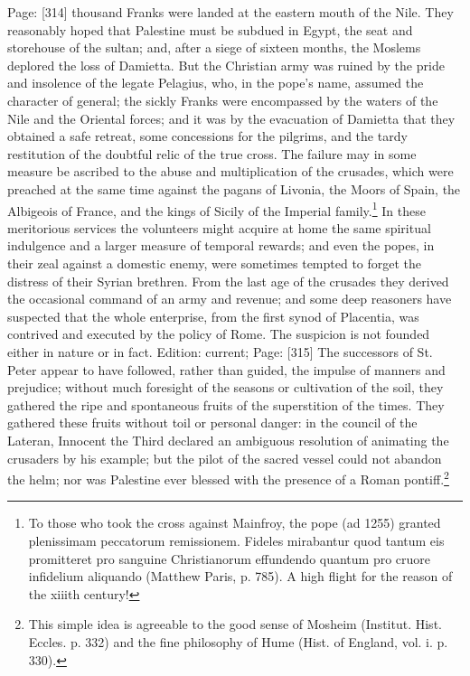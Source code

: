 Page: [314] thousand Franks were landed at the eastern mouth of the Nile. They reasonably hoped that Palestine must be subdued in Egypt, the seat and storehouse of the sultan; and, after a siege of sixteen months, the Moslems deplored the loss of Damietta. But the Christian army was ruined by the pride and insolence of the legate Pelagius, who, in the pope\texthebrew{}’s name, assumed the character of general; the sickly Franks were encompassed by the waters of the Nile and the Oriental forces; and it was by the evacuation of Damietta that they obtained a safe retreat, some concessions for the pilgrims, and the tardy restitution of the doubtful relic of the true cross. The failure may in some measure be ascribed to the abuse and multiplication of the crusades, which were preached at the same time against the pagans of Livonia, the Moors of Spain, the Albigeois of France, and the kings of Sicily of the Imperial family.\footnote{To those who took the cross against Mainfroy, the pope (ad 1255) granted plenissimam peccatorum remissionem. Fideles mirabantur quod tantum eis promitteret pro sanguine Christianorum effundendo quantum pro cruore infidelium aliquando (Matthew Paris, p. 785). A high flight for the reason of the xiiith century!} In these meritorious services the volunteers might acquire at home the same spiritual indulgence and a larger measure of temporal rewards; and even the popes, in their zeal against a domestic enemy, were sometimes tempted to forget the distress of their Syrian brethren. From the last age of the crusades they derived the occasional command of an army and revenue; and some deep reasoners have suspected that the whole enterprise, from the first synod of Placentia, was contrived and executed by the policy of Rome. The suspicion is not founded either in nature or in fact. Edition: current; Page: [315] The successors of St. Peter appear to have followed, rather than guided, the impulse of manners and prejudice; without much foresight of the seasons or cultivation of the soil, they gathered the ripe and spontaneous fruits of the superstition of the times. They gathered these fruits without toil or personal danger: in the council of the Lateran, Innocent the Third declared an ambiguous resolution of animating the crusaders by his example; but the pilot of the sacred vessel could not abandon the helm; nor was Palestine ever blessed with the presence of a Roman pontiff.\footnote{This simple idea is agreeable to the good sense of Mosheim (Institut. Hist. Eccles. p. 332) and the fine philosophy of Hume (Hist. of England, vol. i. p. 330).}

